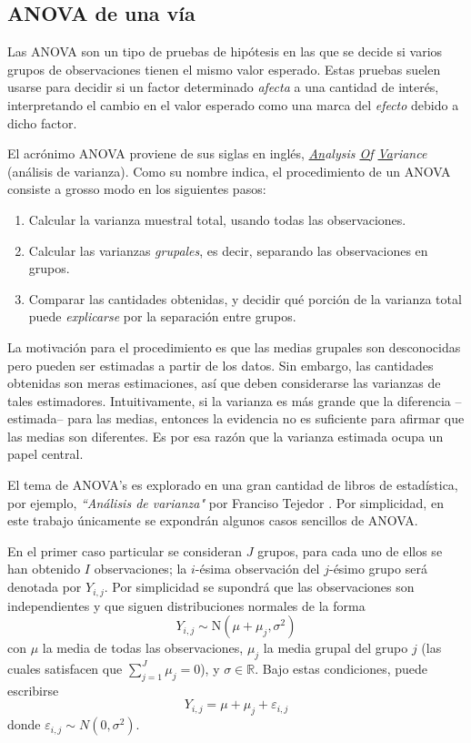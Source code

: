 \documentclass[12pt,letterpaper]{book}
\newcommand{\R}{\mathbb{R}}
\begin{document}
\subsection{ANOVA de una vía}

Las ANOVA son un tipo de pruebas de hipótesis en las que se decide si varios grupos de observaciones tienen el mismo valor esperado.
%
Estas pruebas suelen usarse para decidir si un factor determinado \textit{afecta} a una cantidad de interés, interpretando el cambio en el valor esperado como una marca del \textit{efecto} debido a dicho factor.

El acrónimo ANOVA proviene de sus siglas en inglés, \textit{\underline{An}alysis \underline{O}f \underline{Va}riance} (análisis de varianza). 
%
Como su nombre indica, el procedimiento de un ANOVA consiste a grosso modo en los siguientes pasos:
\begin{enumerate}
\item Calcular la varianza muestral total, usando todas las observaciones.
\item Calcular las varianzas \textit{grupales}, es decir, separando las observaciones en grupos.
\item Comparar las cantidades obtenidas, y decidir qué porción de la varianza total puede \textit{explicarse} por la separación entre grupos.
\end{enumerate} 

La motivación para el procedimiento es que las medias grupales son desconocidas pero pueden ser estimadas a partir de los datos.
%
Sin embargo, las cantidades obtenidas son meras estimaciones, así que deben considerarse las varianzas de tales estimadores.
%
Intuitivamente, si la varianza es más grande que la diferencia --estimada-- para las medias, entonces la evidencia no es suficiente para afirmar que las medias son diferentes.
%
Es por esa razón que la varianza estimada ocupa un papel central.

El tema de ANOVA's es explorado en una gran cantidad de libros de estadística, por ejemplo, \textit{``Análisis de varianza"} por Franciso Tejedor \cite{tejedor99}.
%
Por simplicidad, en este trabajo únicamente se expondrán algunos casos sencillos de ANOVA.

En el primer caso particular se consideran $J$ grupos, para cada uno de ellos se han obtenido $I$ observaciones; la $i$-ésima observación del $j$-ésimo grupo será denotada por $Y_{i,j}$.
%
Por simplicidad se supondrá que las observaciones son independientes y que siguen distribuciones normales de la forma 
\begin{equation}
Y_{i,j} \sim \text{N}(\mu+\mu_j, \sigma^2)
\end{equation}
con $\mu$ la media de todas las observaciones, $\mu_j$ la media grupal del grupo $j$ (las cuales satisfacen que $\sum_{j = 1}^J \mu_j = 0$), y $\sigma\in \R$.
%
Bajo estas condiciones, puede escribirse
\begin{equation}
Y_{i,j} = \mu + \mu_j + \varepsilon_{i,j}
\end{equation}
donde $\varepsilon_{i,j}\sim N(0,\sigma^2)$. 
\end{document}
